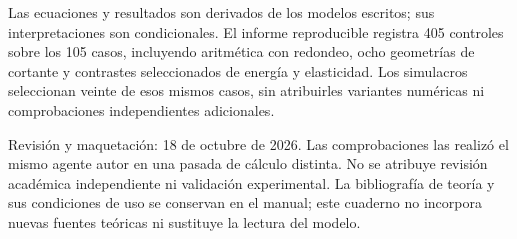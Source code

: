 \documentclass[10pt,a4paper,openany]{book}
\begin{document}
Las ecuaciones y resultados son derivados de los modelos escritos; sus interpretaciones son condicionales. El informe reproducible registra 405 controles sobre los 105 casos, incluyendo aritmética con redondeo, ocho geometrías de cortante y contrastes seleccionados de energía y elasticidad. Los simulacros seleccionan veinte de esos mismos casos, sin atribuirles variantes numéricas ni comprobaciones independientes adicionales.

Revisión y maquetación: 18 de octubre de 2026. Las comprobaciones las realizó el mismo agente autor en una pasada de cálculo distinta. No se atribuye revisión académica independiente ni validación experimental. La bibliografía de teoría y sus condiciones de uso se conservan en el manual; este cuaderno no incorpora nuevas fuentes teóricas ni sustituye la lectura del modelo.
\end{document}
